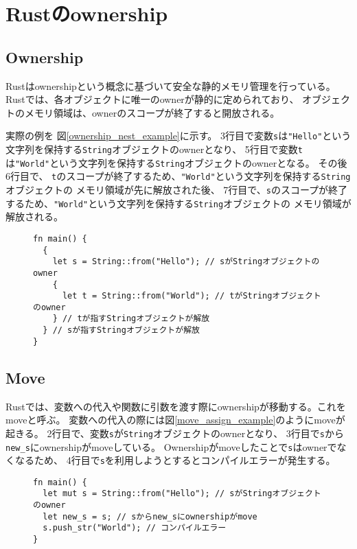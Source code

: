 \documentclass{sumiilab-paper}
\theoremstyle{mystyle}
\numberwithin{definition}{chapter} %
\begin{document}
\section{Rustのownership}

\subsection{Ownership}
Rustはownershipという概念に基づいて安全な静的メモリ管理を行っている。
Rustでは、各オブジェクトに唯一のownerが静的に定められており、
オブジェクトのメモリ領域は、ownerのスコープが終了すると開放される。

実際の例を
図\ref{ownership_nest_example}に示す。
3行目で変数\texttt{s}は\texttt{"Hello"}という文字列を保持する\texttt{String}オブジェクトのownerとなり、
5行目で変数\texttt{t}は\texttt{"World"}という文字列を保持する\texttt{String}オブジェクトのownerとなる。
その後6行目で、
\texttt{t}のスコープが終了するため、\texttt{"World"}という文字列を保持する\texttt{String}オブジェクトの
メモリ領域が先に解放された後、
7行目で、\texttt{s}のスコープが終了するため、\texttt{"World"}という文字列を保持する\texttt{String}オブジェクトの
メモリ領域が解放される。
\begin{figure}[htp]
\begin{lstlisting}[caption=Ownershipによるメモリ管理,label=ownership_nest_example, captionpos=b]
fn main() {
  {
    let s = String::from("Hello"); // sがStringオブジェクトのowner
    {
      let t = String::from("World"); // tがStringオブジェクトのowner
    } // tが指すStringオブジェクトが解放
  } // sが指すStringオブジェクトが解放
}
\end{lstlisting}
\end{figure}

\subsection{Move}
Rustでは、変数への代入や関数に引数を渡す際にownershipが移動する。これをmoveと呼ぶ。
変数への代入の際には図\ref{move_assign_example}のようにmoveが起きる。
2行目で、変数\texttt{s}が\texttt{String}オブジェクトのownerとなり、
3行目で\texttt{s}から\texttt{new\_s}にownershipがmoveしている。
Ownershipがmoveしたことで\texttt{s}はownerでなくなるため、
4行目で\texttt{s}を利用しようとするとコンパイルエラーが発生する。
\begin{figure}[htp]
\begin{lstlisting}[caption=変数への代入でmoveが起こる例,
  label=move_assign_example, captionpos=b]
fn main() {
  let mut s = String::from("Hello"); // sがStringオブジェクトのowner
  let new_s = s; // sからnew_sにownershipがmove
  s.push_str("World"); // コンパイルエラー
}    
\end{lstlisting}
\end{figure}
\end{document}
